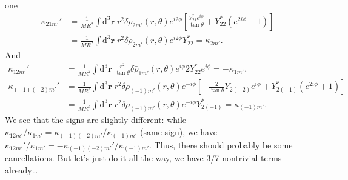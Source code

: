\documentclass[12pt]{article}
\newcommand*{\bm}[1]{\boldsymbol{\mathbf{#1}}}
\newcommand*{\p}[1]{\left(#1\right)}
\newcommand*{\s}[1]{\left[#1\right]}
\begin{document}
one
\begin{align}
    \kappa_{21m'}'
        &=
            \frac{1}{MR^2}
            \int\limits\mathrm{d}^3 \bm{r}\;
            r^2
            \delta \bar{\rho}_{2m'}(r, \theta)
            e^{i2\phi}
            \s{\frac{Y_{21}^* e^{i\phi}}{\tan\theta}
                + Y_{22}^* \p{e^{2i\phi} + 1}}\nonumber\\
        &=
            \frac{1}{MR^2}
            \int\limits\mathrm{d}^3 \bm{r}\;
            r^2
            \delta \bar{\rho}_{2m'}(r, \theta)
            e^{i2\phi} Y_{22}^* = \kappa_{2m'}.
\end{align}
And
\begin{align}
    \kappa_{12m'}'
        &=
            \frac{1}{MR^2}
            \int\limits\mathrm{d}^3\bm{r}\;
                \frac{r^2}{\tan\theta}
                \delta\bar{\rho}_{1m'}(r, \theta)
                e^{i\phi}
                2Y_{22}^* e^{i\phi} = -\kappa_{1m'},\\
    \kappa_{(-1)(-2)m'}'
        &=
            \frac{1}{MR^2}
            \int\limits\mathrm{d}^3\bm{r}\;
                r^2
                \delta\bar{\rho}_{(-1)m'}(r, \theta)
                e^{-i\phi}
                \s{-\frac{2}{\tan\theta}Y_{2(-2)}e^{i\phi}
                    + Y_{2(-1)}^*\p{e^{2i\phi} + 1}}\nonumber\\
        &=
            \frac{1}{MR^2}
            \int\limits\mathrm{d}^3\bm{r}\;
                r^2
                \delta\bar{\rho}_{(-1)m'}(r, \theta)
                e^{-i\phi}
                Y_{2(-1)}^*
        = \kappa_{(-1)m'}.
\end{align}
We see that the signs are slightly different: while $\kappa_{12m'} /
\kappa_{1m'} = \kappa_{(-1)(-2)m'} / \kappa_{(-1)m'}$ (same sign), we have
$\kappa_{12m'}' / \kappa_{1m'} = -\kappa_{(-1)(-2)m'}' / \kappa_{(-1)m'}$. Thus,
there should probably be some cancellations. But let's just do it all the way,
we have 3/7 nontrivial terms already\dots
\end{document}
